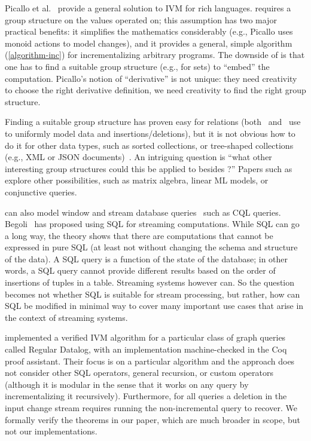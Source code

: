 Picallo et al.~\cite{picallo-scop19} provide a general solution to IVM
for rich languages.  \dbsp requires a group structure on the values
operated on; this assumption has two major practical benefits: it
simplifies the mathematics considerably (e.g., Picallo uses monoid
actions to model changes), and it provides a general, simple algorithm
(\ref{algorithm-inc}) for incrementalizing arbitrary programs.  The
downside of \dbsp is that one has to find a suitable group structure
(e.g., \zrs for sets) to ``embed'' the computation.  Picallo's notion
of ``derivative'' is not unique: they need creativity to choose the
right derivative definition, we need creativity to find the right
group structure.

Finding a suitable group structure has proven easy for relations
(both~\cite{koch-pods10} and~\cite{green-tcs11} use \zrs to uniformly
model data and insertions/deletions), but it is not obvious how to do
it for other data types, such as sorted collections, or tree-shaped
collections (e.g., XML or JSON documents)~\cite{foster-planx08}.  An
intriguing question is ``what other interesting group structures could
this be applied to besides \zrs?''  Papers such
as~\cite{nikolic-icmd18} explore other possibilities, such as matrix
algebra, linear ML models, or conjunctive queries.

\dbsp can also model window and stream database
queries~\cite{arasu-tr02,aurora} such as CQL queries.
Begoli~\cite{begoli-sigmod19} has proposed using SQL for streaming
computations.  While SQL can go a long way, the \dbsp theory shows
that there are computations that cannot be expressed in pure SQL (at
least not without changing the schema and structure of the data).  A
SQL query is a function of the state of the database; in other words,
a SQL query cannot provide different results based on the order of
insertions of tuples in a table.  Streaming systems however can.  So
the question becomes not whether SQL is suitable for stream
processing, but rather, how can SQL be modified in minimal way to
cover many important use cases that arise in the context of streaming
systems.

\cite{bonifati-iclp2018} implemented a verified IVM algorithm for a
particular class of graph queries called Regular Datalog, with an
implementation machine-checked in the Coq proof assistant. Their focus
is on a particular algorithm and the approach does not consider other
SQL operators, general recursion, or custom operators (although it is
modular in the sense that it works on any query by incrementalizing it
recursively). Furthermore, for all queries a deletion in the input
change stream requires running the non-incremental query to recover.
We formally verify the theorems in our paper, which are much broader
in scope, but not our implementations.


